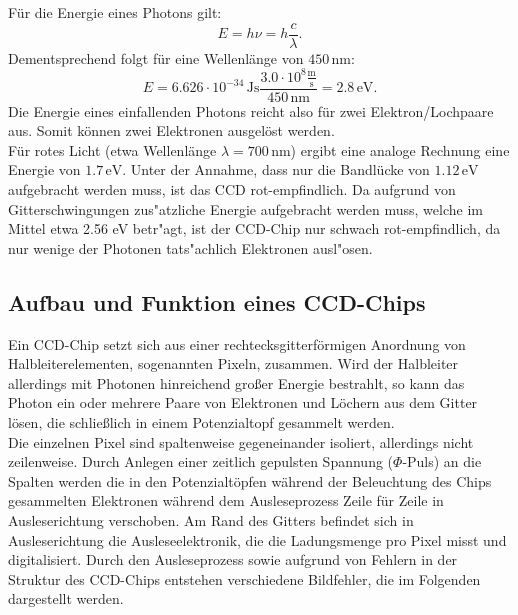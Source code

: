 Für die Energie eines Photons gilt: 
\begin{equation}
E = h \nu = h \frac{c}{\lambda}. 
\end{equation}
Dementsprechend folgt für eine Wellenlänge von $450\, \textrm{nm}$: 
\begin{equation}
E = 6.626 \cdot 10^{-34}\, \textrm{Js} \frac{3.0 \cdot 10^8 \frac{\textrm{m}}{\textrm{s}}}{450\, \textrm{nm}} = 2.8\, \textrm{eV}. 
\end{equation}
Die Energie eines einfallenden Photons reicht also für zwei Elektron/Lochpaare aus. Somit können zwei Elektronen ausgelöst werden. \\
Für rotes Licht (etwa Wellenlänge $\lambda = 700\, \textrm{nm} $) ergibt eine analoge Rechnung eine Energie von $1.7\, \textrm{eV} $. Unter der Annahme, dass nur die Bandlücke von $1.12\, \textrm{eV} $ aufgebracht werden muss, ist das CCD rot-empfindlich. Da aufgrund von Gitterschwingungen zus"atzliche Energie aufgebracht werden muss, welche im Mittel etwa 2.56 eV betr"agt, ist der CCD-Chip nur schwach rot-empfindlich, da nur wenige der Photonen tats"achlich Elektronen ausl"osen.  

\subsection{Aufbau und Funktion eines CCD-Chips}
Ein CCD-Chip setzt sich aus einer rechtecksgitterförmigen Anordnung von Halbleiterelementen, sogenannten Pixeln, zusammen. Wird der Halbleiter allerdings mit Photonen hinreichend großer Energie bestrahlt, so kann das Photon ein oder mehrere Paare von Elektronen und Löchern aus dem Gitter lösen, die schließlich in einem Potenzialtopf gesammelt werden. \\
Die einzelnen Pixel sind spaltenweise gegeneinander isoliert, allerdings nicht zeilenweise. Durch Anlegen einer zeitlich gepulsten Spannung ($\Phi$-Puls) an die Spalten werden die in den Potenzialtöpfen während der Beleuchtung des Chips gesammelten Elektronen während dem Ausleseprozess Zeile für Zeile in Ausleserichtung verschoben. Am Rand des Gitters befindet sich in Ausleserichtung die Ausleseelektronik, die die Ladungsmenge pro Pixel misst und digitalisiert. Durch den Ausleseprozess sowie aufgrund von Fehlern in der Struktur des CCD-Chips entstehen verschiedene Bildfehler, die im Folgenden dargestellt werden. 

